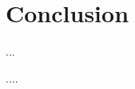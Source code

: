 \documentclass[
    reprint, 
    aps,
    preprintnumbers,
    twocolumn,
    prb,
    superscriptaddress
]{revtex4-2}
\begin{document}
\section{Conclusion}\label{sec:conclusion}

...


\begin{acknowledgments} 
    ....
\end{acknowledgments}


%
		
\end{document}
